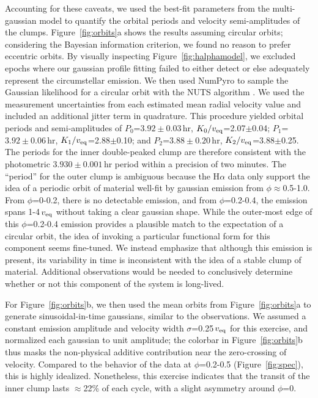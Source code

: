 \documentclass[11pt,twocolumn,tighten]{aastex7}
\begin{document}
Accounting for these caveats, we used the best-fit parameters
from the multi-gaussian model to quantify the orbital periods and
velocity semi-amplitudes of the clumps.  Figure~\ref{fig:orbits}a
shows the results assuming circular orbits; considering the Bayesian
information criterion, we found no reason to prefer eccentric orbits.
By visually inspecting Figure~\ref{fig:halphamodel}, we
excluded epochs where our gaussian profile fitting failed to either
detect or else adequately represent the circumstellar emission.  We
then used NumPyro to sample the Gaussian likelihood for a circular
orbit with the NUTS algorithm \citep{Phan2019}.  We used the
measurement uncertainties from each estimated mean radial velocity
value and included an additional jitter term in quadrature.  This
procedure yielded orbital periods and semi-amplitudes of
$P_0$=$3.92\pm0.03$\,hr, $K_0/v_{\rm eq}$=2.07$\pm$0.04;
$P_1$=$3.92\pm0.06$\,hr, $K_1/v_{\rm eq}$=2.88$\pm$0.10;
and $P_2$=$3.88\pm0.20$\,hr, $K_2/v_{\rm eq}$=3.88$\pm$0.25.
The periods for the inner double-peaked clump are therefore consistent
with the photometric $3.930\pm0.001$\,hr period within a precision of
two minutes.  The ``period'' for the outer clump is ambiguous because
the H$\alpha$ data only support the idea of a periodic orbit of
material well-fit by gaussian emission from $\phi$$\approx$0.5-1.0.
From $\phi$=0-0.2, there is no detectable emission, and from
$\phi$=0.2-0.4, the emission spans 1-4\,$v_{\rm eq}$ without taking a
clear gaussian shape.  While the outer-most edge of this
$\phi$=0.2-0.4 emission provides a plausible match to the expectation
of a circular orbit, the idea of invoking a particular functional form
for this component seems fine-tuned.  We instead emphasize that
although this emission is present, its variability in time is
inconsistent with the idea of a stable clump of material.  Additional
observations would be needed to conclusively determine whether or not
this component of the system is long-lived.

For Figure~\ref{fig:orbits}b, we then used the mean orbits from
Figure~\ref{fig:orbits}a to generate sinusoidal-in-time gaussians,
similar to the observations.  We assumed a constant emission amplitude
and velocity width $\sigma$=0.25\,$v_{\rm eq}$ for this exercise, and
normalized each gaussian to unit amplitude;  the colorbar in
Figure~\ref{fig:orbits}b thus masks the non-physical additive
contribution near the zero-crossing of velocity.  Compared to the
behavior of the data at $\phi$=0.2-0.5 (Figure~\ref{fig:spec}), this
is highly idealized.  Nonetheless, this exercise indicates that the
transit of the inner clump lasts $\approx$22\% of each cycle, with a
slight asymmetry around $\phi$=0.
\end{document}

